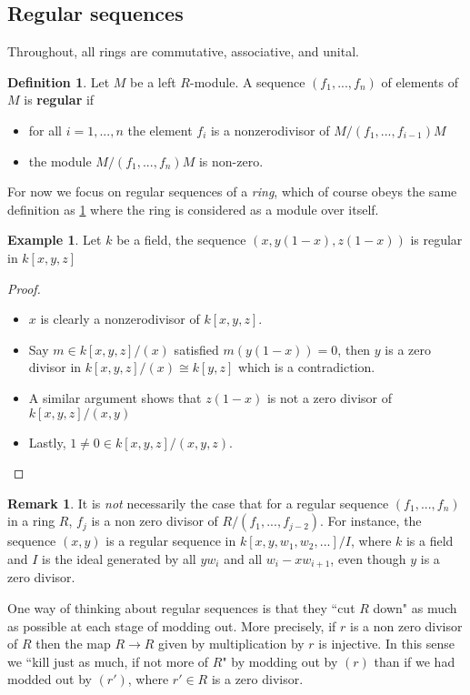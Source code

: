 \documentclass[12pt]{article}
\theoremstyle{plain}
\theoremstyle{definition}
\newtheorem{defn}[thm]{Definition} %
\newtheorem{remark}[thm]{Remark}
\newtheorem{example}[thm]{Example}
\begin{document}
\subsection{Regular sequences}
Throughout, all rings are commutative, associative, and unital.
\begin{defn}\label{def:regular_sequence}
Let $M$ be a left $R$-module. A sequence $(f_1,...,f_n)$ of elements of $M$ is \textbf{regular} if
\begin{itemize}
    \item for all $i = 1,...,n$ the element $f_i$ is a nonzerodivisor of $M/(f_1,...,f_{i-1})M$
    \item the module $M/(f_1,...,f_n)M$ is non-zero.
\end{itemize}
\end{defn}
For now we focus on regular sequences of a \emph{ring}, which of course obeys the same definition as \ref{def:regular_sequence} where the ring is considered as a module over itself.
\begin{example}
Let $k$ be a field, the sequence $(x,y(1-x),z(1-x))$ is regular in $k[x,y,z]$
\end{example}
\begin{proof}
\begin{itemize}
    \item $x$ is clearly a nonzerodivisor of $k[x,y,z]$.
    \item Say $m \in k[x,y,z]/(x)$ satisfied $m(y(1-x)) = 0$, then $y$ is a zero divisor in $k[x,y,z]/(x) \cong k[y,z]$ which is a contradiction.
    \item A similar argument shows that $z(1-x)$ is not a zero divisor of $k[x,y,z]/(x,y)$
    \item Lastly, $1 \neq 0 \in k[x,y,z]/(x,y,z)$.
\end{itemize}
\end{proof}
\begin{remark}
It is \emph{not} necessarily the case that for a regular sequence $(f_1,...,f_n)$ in a ring $R$, $f_j$ is a non zero divisor of $R/(f_1,...,f_{j-2})$. For instance, the sequence $(x,y)$ is a regular sequence in $k[x,y,w_1,w_2,...]/I$, where $k$ is a field and $I$ is the ideal generated by all $yw_i$ and all $w_i - xw_{i+1}$, even though $y$ is a zero divisor.
\end{remark}
One way of thinking about regular sequences is that they ``cut $R$ down" as much as possible at each stage of modding out. More precisely, if $r$ is a non zero divisor of $R$ then the map $R \to R$ given by multiplication by $r$ is injective. In this sense we ``kill just as much, if not more of $R$" by modding out by $(r)$ than if we had modded out by $(r')$, where $r' \in R$ is a zero divisor.
\end{document}
